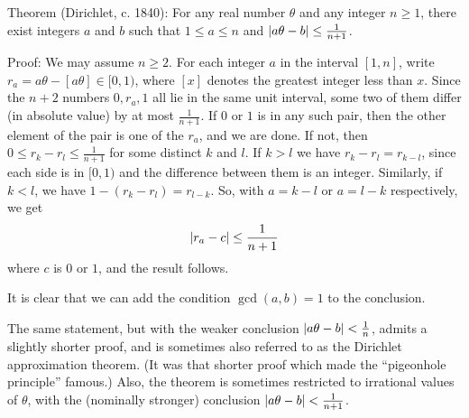 \documentclass[12pt]{article}
\begin{document}
Theorem (Dirichlet, c. 1840): For any real number $\theta$ and any integer
$n\ge 1$, there exist integers
$a$ and $b$ such that $1 \le a \le n$ and
$ \arrowvert a\theta-b \arrowvert \le \frac{1}{n+1}$.

Proof: We may assume $n\ge 2$.
For each integer $a$ in the interval $[1,n]$, write
$r_a = a\theta - [a\theta] \in [0,1)$, where $[x]$ denotes
the greatest integer less than $x$. Since the $n+2$
numbers $0, r_a, 1$ all lie in the same unit interval, some two
of them differ (in absolute value) by at most $\frac{1}{n+1}$.
If $0$ or $1$ is in any such pair, then the other element of the
pair is one of the $r_a$, and we are done.
If not, then $0 \le r_k - r_l \le \frac{1}{n+1}$ for some distinct $k$
and $l$. If $k>l$ we have $r_k - r_l = r_{k-l}$, since each side is in
$[0,1)$ and the difference between them is an integer. Similarly,
if $k<l$, we have $1-(r_k - r_l) = r_{l-k}$. So, with $a=k-l$ or
$a=l-k$ respectively, we get
\[ \arrowvert r_a - c \arrowvert \le \frac{1}{n+1} \]
where $c$ is $0$ or $1$, and the result follows.

It is clear that we can add the condition $\gcd(a,b)=1$ to the conclusion.

The same statement, but with the weaker conclusion
$ \arrowvert a\theta-b \arrowvert < \frac{1}{n}$,
admits a slightly shorter proof, and is sometimes also referred to
as the Dirichlet approximation theorem. (It was that shorter proof
which made the ``pigeonhole principle'' famous.) Also, the theorem
is sometimes restricted to irrational values of $\theta$, with the
(nominally stronger) conclusion
$\arrowvert a\theta-b \arrowvert < \frac{1}{n+1}$.
\end{document}
